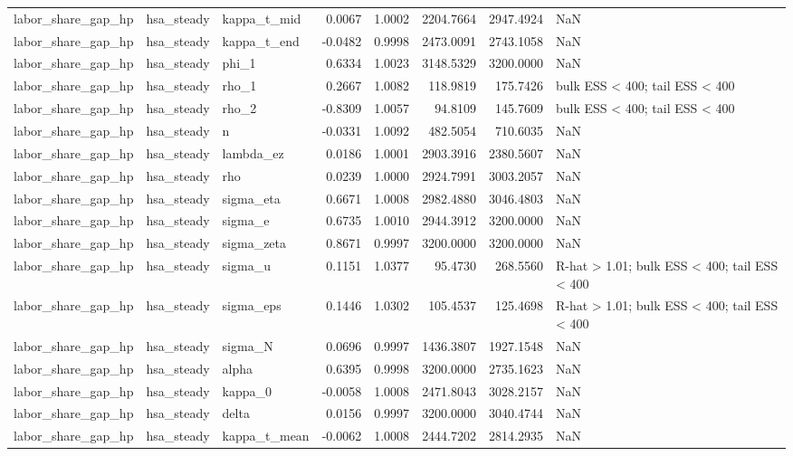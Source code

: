 \begin{tabular}{lllrrrrl}
labor\_share\_gap\_hp & hsa\_steady & kappa\_t\_mid & 0.0067 & 1.0002 & 2204.7664 & 2947.4924 & NaN \\
labor\_share\_gap\_hp & hsa\_steady & kappa\_t\_end & -0.0482 & 0.9998 & 2473.0091 & 2743.1058 & NaN \\
labor\_share\_gap\_hp & hsa\_steady & phi\_1 & 0.6334 & 1.0023 & 3148.5329 & 3200.0000 & NaN \\
labor\_share\_gap\_hp & hsa\_steady & rho\_1 & 0.2667 & 1.0082 & 118.9819 & 175.7426 & bulk ESS < 400; tail ESS < 400 \\
labor\_share\_gap\_hp & hsa\_steady & rho\_2 & -0.8309 & 1.0057 & 94.8109 & 145.7609 & bulk ESS < 400; tail ESS < 400 \\
labor\_share\_gap\_hp & hsa\_steady & n & -0.0331 & 1.0092 & 482.5054 & 710.6035 & NaN \\
labor\_share\_gap\_hp & hsa\_steady & lambda\_ez & 0.0186 & 1.0001 & 2903.3916 & 2380.5607 & NaN \\
labor\_share\_gap\_hp & hsa\_steady & rho & 0.0239 & 1.0000 & 2924.7991 & 3003.2057 & NaN \\
labor\_share\_gap\_hp & hsa\_steady & sigma\_eta & 0.6671 & 1.0008 & 2982.4880 & 3046.4803 & NaN \\
labor\_share\_gap\_hp & hsa\_steady & sigma\_e & 0.6735 & 1.0010 & 2944.3912 & 3200.0000 & NaN \\
labor\_share\_gap\_hp & hsa\_steady & sigma\_zeta & 0.8671 & 0.9997 & 3200.0000 & 3200.0000 & NaN \\
labor\_share\_gap\_hp & hsa\_steady & sigma\_u & 0.1151 & 1.0377 & 95.4730 & 268.5560 & R-hat > 1.01; bulk ESS < 400; tail ESS < 400 \\
labor\_share\_gap\_hp & hsa\_steady & sigma\_eps & 0.1446 & 1.0302 & 105.4537 & 125.4698 & R-hat > 1.01; bulk ESS < 400; tail ESS < 400 \\
labor\_share\_gap\_hp & hsa\_steady & sigma\_N & 0.0696 & 0.9997 & 1436.3807 & 1927.1548 & NaN \\
labor\_share\_gap\_hp & hsa\_steady & alpha & 0.6395 & 0.9998 & 3200.0000 & 2735.1623 & NaN \\
labor\_share\_gap\_hp & hsa\_steady & kappa\_0 & -0.0058 & 1.0008 & 2471.8043 & 3028.2157 & NaN \\
labor\_share\_gap\_hp & hsa\_steady & delta & 0.0156 & 0.9997 & 3200.0000 & 3040.4744 & NaN \\
labor\_share\_gap\_hp & hsa\_steady & kappa\_t\_mean & -0.0062 & 1.0008 & 2444.7202 & 2814.2935 & NaN \\

\end{tabular}
